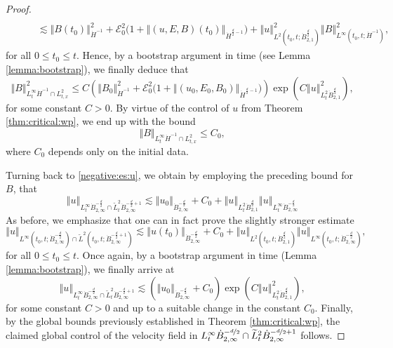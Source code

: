 \documentclass[11pt, leqno, a4paper,]{amsart}
\theoremstyle{remark}
\numberwithin{equation}{section}
\newcommand*{\norm}[1]{\left\Vert #1\right\Vert}
\begin{document}
\begin{proof}
\begin{equation*}
\begin{aligned}
 		\\
 		&\qquad\lesssim \norm {B (t_0)}_{\dot H^{-1}} ^2 + \mathcal E_0^2\Big (1+ \norm {(u,E,B)(t_0)}_{\dot H^{\frac{d}{2}-1}} \Big )  +  \norm { u }_{L^2(t_0,t; \dot B^{\frac{d}{2}}_{2,1})}^2 \norm {   B}_{L^\infty (t_0,t; \dot H^{-1})}^2  ,
 	\end{aligned}
 \end{equation*}
 for all $0\leq t_0 \leq t$. 
 Hence, by a bootstrap argument in time (see Lemma \ref{lemma:bootstrap}), we finally deduce that   
 	\begin{equation*}
 	\norm {B}_{L^\infty_t \dot H^{-1}\cap L^2_{t,x}} ^2 \leq C \left( \norm {B_0}_{\dot H^{-1}} ^2 + \mathcal E_0^2 \Big (1+ \norm {(u_0,E_0,B_0)}_{\dot H^{\frac{d}{2}-1}} \Big ) \right)   \exp\left( C  \norm { u }_{L^2_t \dot B^{\frac{d}{2}}_{2,1}}^2  \right),
 \end{equation*}
 for some constant $C>0$. By virtue of the control of $u$ from Theorem \ref{thm:critical:wp}, we end up with the bound \begin{equation*}
 	\norm {B}_{L^\infty_t \dot H^{-1}\cap L^2_{t,x}} \leq C_0,
 \end{equation*}
 where $C_0$ depends only on the initial data.
 
 Turning back to \eqref{negative:es:u}, we obtain by employing the preceding bound for $B$, that 
 \begin{equation*}
 	\norm {u}_{L^\infty_t \dot  B^{-\frac{d}{2}}_{2,\infty} \cap \widetilde L^2_t \dot B^{-\frac{d}{2}+ 1}_{2,\infty}} 
		 \lesssim \norm {u_0}_{  \dot B^{-\frac{d}{2} }_{2,\infty}}  + C_0   + \norm {u }_{ L^2_t \dot B^{\frac{d}{2}}_{2,1}}\norm {u }_{  L^\infty _t \dot B^{-\frac{d}{2}}_{2,\infty}}  
 \end{equation*}
 As before, we emphasize that one can in fact prove the slightly stronger estimate 
 \begin{equation*}
 	\norm {u}_{L^\infty(t_0,t; \dot  B^{-\frac{d}{2}}_{2,\infty}) \cap \widetilde L^2(t_0,t; \dot B^{-\frac{d}{2}+ 1}_{2,\infty})} 
		 \lesssim \norm {u (t_0)}_{  \dot B^{-\frac{d}{2} }_{2,\infty}}  + C_0   + \norm {u }_{ L^2(t_0,t; \dot B^{\frac{d}{2}}_{2,1})}\norm {u }_{  L^\infty (t_0,t; \dot B^{-\frac{d}{2}}_{2,\infty})}  ,
 \end{equation*}
 for all $0\leq t_0 \leq t$.
 Once again, by a bootstrap argument in time (Lemma \ref{lemma:bootstrap}), we finally arrive at   
 \begin{equation*}
 	\norm {u}_{L^\infty_t \dot  B^{-\frac{d}{2}}_{2,\infty} \cap \widetilde L^2_t \dot B^{-\frac{d}{2}+ 1}_{2,\infty}} \lesssim \left( \norm {u_0}_{  \dot B^{-\frac{d}{2} }_{2,\infty}}  + C_0 \right) \exp\left( C  \norm { u }_{L^2_t \dot B^{\frac{d}{2}}_{2,1}}^2  \right),
 \end{equation*}
 for some constant $C>0$ and up to a suitable change in the constant $C_0$. Finally, by the global bounds previously established in Theorem \ref{thm:critical:wp}, the claimed global control of the velocity field in $L^\infty_t \dot  B^{-\nicefrac{d}{2}}_{2,\infty} \cap \widetilde L^2_t \dot B^{-\nicefrac{d}{2}+ 1}_{2,\infty}$ follows.
 

\end{proof}
\end{document}
